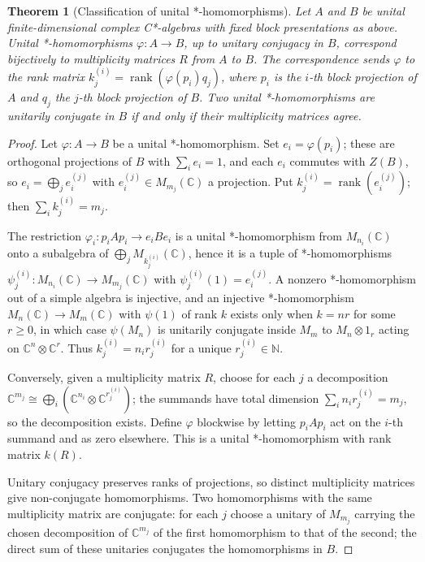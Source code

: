 \documentclass[11pt,letterpaper]{article}
\newtheorem{theorem}{Theorem}[section]
\theoremstyle{definition}
\theoremstyle{remark}
\begin{document}
\begin{theorem}[Classification of unital *-homomorphisms]
\label{thm:homs}
Let $A$ and $B$ be unital finite-dimensional complex C*-algebras with fixed block presentations as above. Unital *-homomorphisms $\varphi \colon A \to B$, up to unitary conjugacy in $B$, correspond bijectively to multiplicity matrices $R$ from $A$ to $B$. The correspondence sends $\varphi$ to the rank matrix $k^{(i)}_j = \operatorname{rank}(\varphi(p_i) q_j)$, where $p_i$ is the $i$-th block projection of $A$ and $q_j$ the $j$-th block projection of $B$. Two unital *-homomorphisms are unitarily conjugate in $B$ if and only if their multiplicity matrices agree.
\end{theorem}

\begin{proof}
Let $\varphi \colon A \to B$ be a unital *-homomorphism. Set $e_i = \varphi(p_i)$; these are orthogonal projections of $B$ with $\sum_i e_i = 1$, and each $e_i$ commutes with $Z(B)$, so $e_i = \bigoplus_j e_i^{(j)}$ with $e_i^{(j)} \in M_{m_j}(\mathbb{C})$ a projection. Put $k^{(i)}_j = \operatorname{rank}(e_i^{(j)})$; then $\sum_i k^{(i)}_j = m_j$.

The restriction $\varphi_i \colon p_i A p_i \to e_i B e_i$ is a unital *-homomorphism from $M_{n_i}(\mathbb{C})$ onto a subalgebra of $\bigoplus_j M_{k^{(i)}_j}(\mathbb{C})$, hence it is a tuple of *-homomorphisms $\psi^{(i)}_j \colon M_{n_i}(\mathbb{C}) \to M_{m_j}(\mathbb{C})$ with $\psi^{(i)}_j(1) = e_i^{(j)}$. A nonzero *-homomorphism out of a simple algebra is injective, and an injective *-homomorphism $M_{n}(\mathbb{C}) \to M_{m}(\mathbb{C})$ with $\psi(1)$ of rank $k$ exists only when $k = n r$ for some $r \geq 0$, in which case $\psi(M_n)$ is unitarily conjugate inside $M_m$ to $M_n \otimes 1_r$ acting on $\mathbb{C}^n \otimes \mathbb{C}^r$. Thus $k^{(i)}_j = n_i r^{(i)}_j$ for a unique $r^{(i)}_j \in \mathbb{N}$.

Conversely, given a multiplicity matrix $R$, choose for each $j$ a decomposition $\mathbb{C}^{m_j} \cong \bigoplus_i (\mathbb{C}^{n_i} \otimes \mathbb{C}^{r^{(i)}_j})$; the summands have total dimension $\sum_i n_i r^{(i)}_j = m_j$, so the decomposition exists. Define $\varphi$ blockwise by letting $p_i A p_i$ act on the $i$-th summand and as zero elsewhere. This is a unital *-homomorphism with rank matrix $k(R)$.

Unitary conjugacy preserves ranks of projections, so distinct multiplicity matrices give non-conjugate homomorphisms. Two homomorphisms with the same multiplicity matrix are conjugate: for each $j$ choose a unitary of $M_{m_j}$ carrying the chosen decomposition of $\mathbb{C}^{m_j}$ of the first homomorphism to that of the second; the direct sum of these unitaries conjugates the homomorphisms in $B$.
\end{proof}
\end{document}
